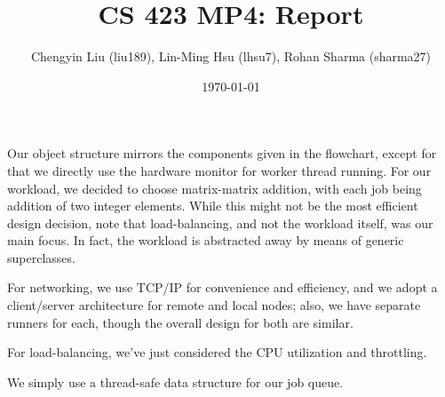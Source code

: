 \documentclass[12pt]{article}
\begin{document}
\title{CS 423 MP4: Report} %
\author{Chengyin Liu (liu189), Lin-Ming Hsu (lhsu7), Rohan Sharma (sharma27)}  %
\date{\today}  %
\maketitle

Our object structure mirrors the components given in the flowchart, except for that we directly use the hardware monitor for worker thread running. For our workload, we decided to choose matrix-matrix addition, with each job being addition of two integer elements. While this might not be the most efficient design decision, note that load-balancing, and not the workload itself, was our main focus. In fact, the workload is abstracted away by means of generic superclasses. 

For networking, we use TCP/IP for convenience and efficiency, and we adopt a client/server architecture for remote and local nodes; also, we have separate runners for each, though the overall design for both are similar.

For load-balancing, we've just considered the CPU utilization and throttling. 

We simply use a thread-safe data structure for our job queue. 
\end{document}
